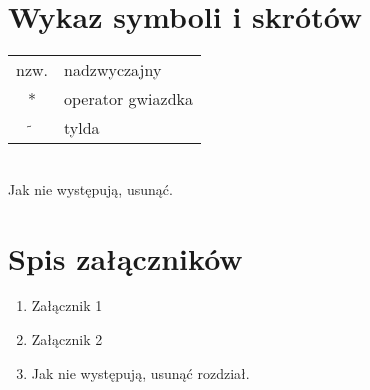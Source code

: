 \documentclass[a4paper,11pt,twoside]{report}
\theoremstyle{definition}
\begin{document}





\thispagestyle{empty}


\chapter*{Wykaz symboli i skrótów}

\begin{tabular}{cl}
  nzw.           & nadzwyczajny      \\
  *              & operator gwiazdka \\
  $\widetilde{}$ & tylda
\end{tabular}
\\
Jak nie występują, usunąć.
\thispagestyle{empty}


\listoffigures
\thispagestyle{empty}


\renewcommand{\listtablename}{Spis tabel}
\listoftables
\thispagestyle{empty}



\chapter*{Spis załączników}
\begin{enumerate}
  \item Załącznik 1
  \item Załącznik 2
  \item Jak nie występują, usunąć rozdział.
\end{enumerate}
\thispagestyle{empty}
\end{document}
